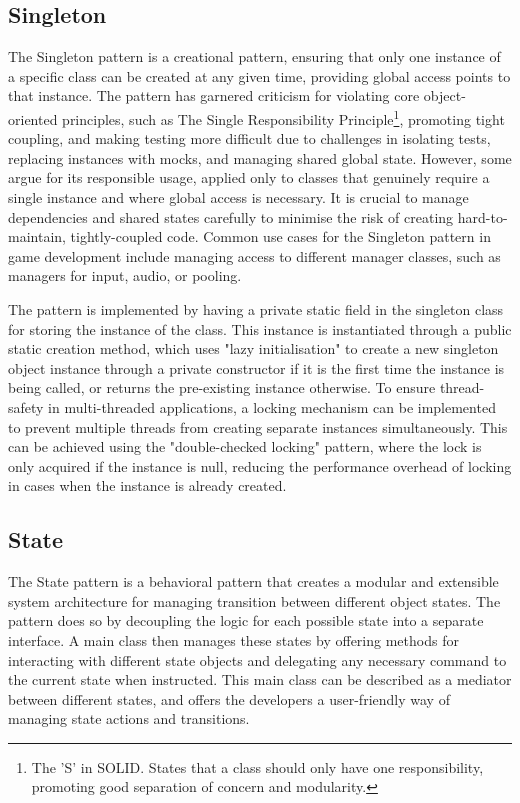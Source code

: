 \subsection{Singleton}
    The Singleton pattern is a creational pattern, ensuring that only one instance of a specific class can be created at any given time, providing global access points to that instance\cite{refactoringguru-singleton}. The pattern has garnered criticism for violating core object-oriented principles, such as The Single Responsibility Principle\footnote{The 'S' in SOLID. States that a class should only have one responsibility, promoting good separation of concern and modularity.}, promoting tight coupling, and making testing more difficult due to challenges in isolating tests, replacing instances with mocks, and managing shared global state. However, some argue for its responsible usage, applied only to classes that genuinely require a single instance and where global access is necessary. It is crucial to manage dependencies and shared states carefully to minimise the risk of creating hard-to-maintain, tightly-coupled code. Common use cases for the Singleton pattern in game development include managing access to different manager classes, such as managers for input, audio, or pooling.

    The pattern is implemented by having a private static field in the singleton class for storing the instance of the class. This instance is instantiated through a public static creation method, which uses "lazy initialisation" to create a new singleton object instance through a private constructor if it is the first time the instance is being called, or returns the pre-existing instance otherwise. To ensure thread-safety in multi-threaded applications, a locking mechanism can be implemented to prevent multiple threads from creating separate instances simultaneously. This can be achieved using the "double-checked locking" pattern, where the lock is only acquired if the instance is null, reducing the performance overhead of locking in cases when the instance is already created.

\subsection{State}
    The State pattern is a behavioral pattern that creates a modular and extensible system architecture for managing transition between different object states\cite{gameprogpatterns-state}. The pattern does so by decoupling the logic for each possible state into a separate interface. A main class then manages these states by offering methods for interacting with different state objects and delegating any necessary command to the current state when instructed. This main class can be described as a mediator between different states, and offers the developers a user-friendly way of managing state actions and transitions.

